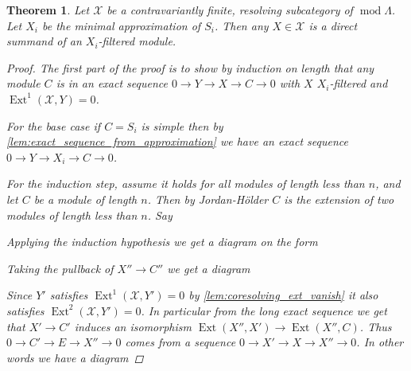 \documentclass[11pt, a4paper, english]{article}
\newtheorem{theorem}{Theorem}[section]
\theoremstyle{definition}
\DeclareMathOperator{\Ext}{Ext}
\def\mod{\operatorname{mod}}
\begin{document}
\begin{theorem} \cite[3.8]{AR91}
	Let $\mathcal X$ be a contravariantly finite, resolving subcategory of $\mod \Lambda$. Let $X_i$ be the minimal approximation of $S_i$. Then any $X \in \mathcal X$ is a direct summand of an $X_i$-filtered module.
	\begin{proof}
		The first part of the proof is to show by induction on length that any module $C$ is in an exact sequence $0 \to Y \to X \to C \to 0$ with $X$ $X_i$-filtered and $\Ext^1(\mathcal X, Y)=0$.
		
		For the base case if $C=S_i$ is simple then by \cref{lem:exact_sequence_from_approximation} we have an exact sequence $0 \to Y \to X_i \to C \to 0$. 
		
		For the induction step, assume it holds for all modules of length less than $n$, and let $C$ be a module of length $n$. Then by Jordan-Hölder $C$ is the extension of two modules of length less than $n$. Say
		\begin{center}
		\end{center}
		Applying the induction hypothesis we get a diagram on the form
		\begin{center}
		\end{center}
		Taking the pullback of $X'' \to C''$ we get a diagram
		\begin{center}
		\end{center}
		Since $Y'$ satisfies $\Ext^1(\mathcal X, Y') = 0$ by \cref{lem:coresolving_ext_vanish} it also satisfies $\Ext^2(\mathcal X, Y')=0$. In particular from the long exact sequence we get that $X' \to C'$ induces an isomorphism $\Ext(X'', X') \to \Ext(X'', C)$. Thus $0 \to C' \to E \to X'' \to 0$ comes from a sequence $0 \to X' \to X \to X'' \to 0$. In other words we have a diagram

\end{proof}
\end{theorem}
\end{document}
